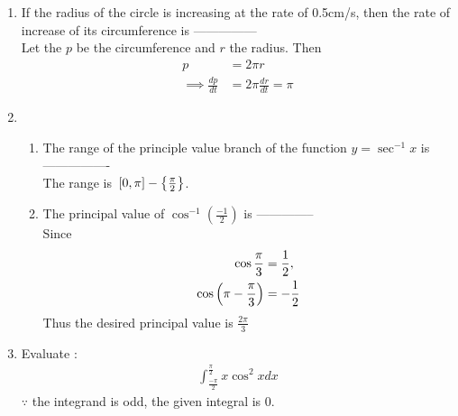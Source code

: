 \documentclass[journal,12pt,twocolumn]{IEEEtran}
\renewcommand\thesection{\arabic{section}}
\begin{document}
\begin{enumerate}[label=\thesection.\arabic*.,ref=\thesection.\theenumi]
\item  If the radius of the circle is increasing at the rate of 0.5cm/s, then the rate of increase of its circumference is ---------------\\
	\solution Let the $p$ be the circumference and $r$ the radius.  Then 
		\begin{align}
			p	&= 2\pi r
			\\
			\implies \frac{dp}{dt} &= 2\pi\frac{dr}{dt} = \pi
		\end{align}

\item \begin{enumerate} \item The range of the principle value branch of the function $ y= \sec^{-1}x $ is ----------------
			\\
			\solution The range is ${}\left[0,\pi\right] - \left\{\frac{\pi}{2}\right\}$.
    
\item The principal value of $\cos^{-1} \left(\frac{-1}{2}\right)$ is --------------\\
	\solution Since
		\begin{align}
			\cos \frac{\pi}{3} &= \frac{1}{2},
			\\
			\cos \left(\pi - \frac{\pi}{3}\right) &= -\frac{1}{2}
		\end{align}
		Thus the desired principal value is $\frac{2\pi}{3}$
\end{enumerate}

\item  Evaluate :
	\begin{align}
         \int_{\frac{-\pi}{2}}^{\frac{\pi}{2}} x \cos^2 x dx \nonumber
	\end{align}  
	\solution $\because$ the integrand is odd, the given integral is 0. 



\end{enumerate}
\end{document}

